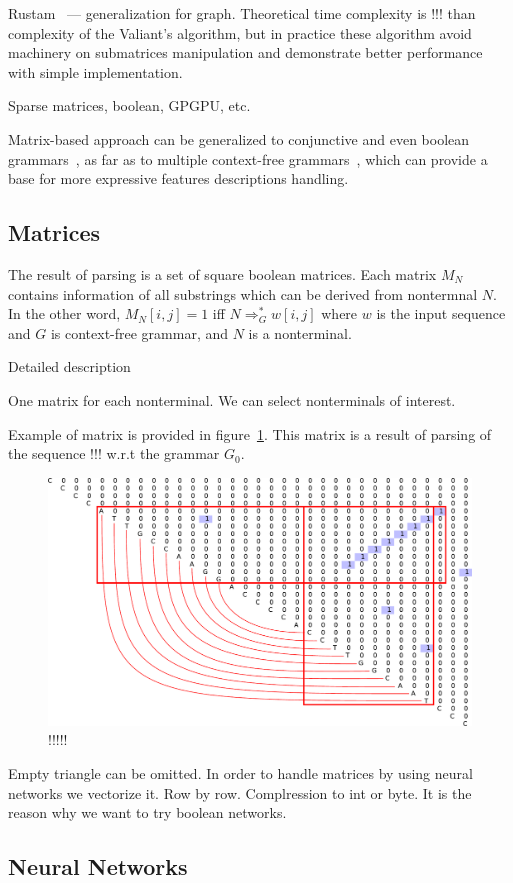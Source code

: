 \documentclass[a4paper,twoside]{article}
\begin{document}
Rustam~\cite{Azimov:2018:CPQ:3210259.3210264} --- generalization for graph. Theoretical time complexity is !!! than complexity of the Valiant's algorithm, but in practice these algorithm avoid machinery on submatrices manipulation and demonstrate better performance with simple implementation.

Sparse matrices, boolean, GPGPU, etc.

Matrix-based approach can be generalized to conjunctive and even boolean grammars~\cite{OKHOTIN2014101}, as far as to multiple context-free grammars~\cite{mcfgMatrices}, which can provide a base for more expressive features descriptions handling.

\subsection{Matrices}

\noindent The result of parsing is a set of square boolean matrices. 
Each matrix $M_N$ contains information of all substrings which can be derived from nontermnal $N$.
In the other word, $M_N[i,j]=1$ iff $N \Rightarrow^*_G w[i,j]$ where $w$ is the input sequence and $G$ is context-free grammar, and $N$ is a nonterminal.

Detailed description

One matrix for each nonterminal.
We can select nonterminals of interest.

Example of matrix is provided in figure~\ref{fig:matrix-simple-stem}.
This matrix is a result of parsing of the sequence !!! w.r.t the grammar $G_0$.

\begin{figure}
\centering
\includegraphics[width=.5\textwidth]{figures/4.pdf}
\caption{!!!!!}
\label{fig:matrix-simple-stem}
\end{figure}


Empty triangle can be omitted.
In order to handle matrices by using neural networks we vectorize it.
Row by row.
Complression to int or byte.
It is the reason why we want to try boolean networks.

\subsection{Neural Networks}
\end{document}
